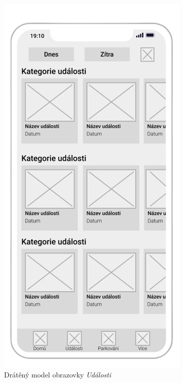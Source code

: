 \begin{minipage}[t]{0.45\textwidth}
\begin{figure}[H]
    \includegraphics[width=.7\textwidth]{events_wireframe.png}
    \caption{Drátěný model obrazovky \textit{Události}}
    \label{fig:wireframe2}
  \end{figure}
\end{minipage}

